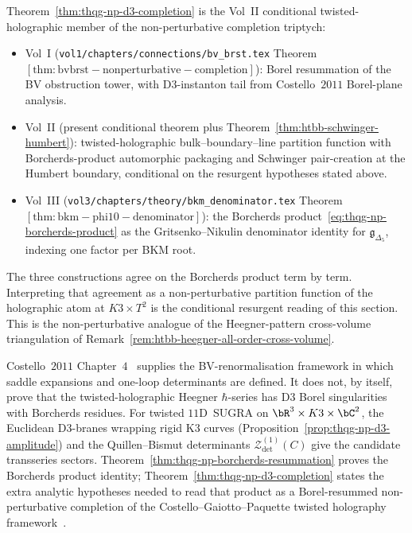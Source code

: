 \begin{remark}
\label{rem:thqg-np-cross-volume}
Theorem~\ref{thm:thqg-np-d3-completion} is the Vol~II conditional
twisted-holographic member of the non-perturbative completion
triptych:
\begin{itemize}[leftmargin=1.8em]
\item Vol~I (\texttt{vol1/chapters/connections/bv\_brst.tex}
Theorem~$\mathrm{[thm:bvbrst-nonperturbative-completion]}$): Borel
resummation of the BV obstruction tower, with D$3$-instanton tail
from Costello~$2011$ Borel-plane analysis.
\item Vol~II (present conditional theorem plus
Theorem~\ref{thm:htbb-schwinger-humbert}): twisted-holographic
bulk--boundary--line partition function with Borcherds-product
automorphic packaging and Schwinger pair-creation at the Humbert
boundary, conditional on the resurgent hypotheses stated above.
\item Vol~III
(\texttt{vol3/chapters/theory/bkm\_denominator.tex}
Theorem~$\mathrm{[thm:bkm-phi10-denominator]}$): the Borcherds
product~\eqref{eq:thqg-np-borcherds-product} as the
Gritsenko--Nikulin denominator identity for $\mathfrak{g}_{\Delta_5}$,
indexing one factor per BKM root.
\end{itemize}
The three constructions agree on the Borcherds product term by term.
Interpreting that agreement as a non-perturbative partition function
of the holographic atom at $K3\times T^2$ is the conditional
resurgent reading of this section. This is the
non-perturbative analogue of the Heegner-pattern cross-volume
triangulation of Remark~\ref{rem:htbb-heegner-all-order-cross-volume}.
\end{remark}

\begin{remark}
\label{rem:thqg-np-costello-renorm}
Costello~$2011$ Chapter~$4$~\cite[Ch.~4]{Costello2011} supplies the
BV-renormalisation framework in which saddle expansions and
one-loop determinants are defined. It does not, by itself, prove that
the twisted-holographic Heegner $\hbar$-series has D$3$ Borel
singularities with Borcherds residues. For twisted $11$D~SUGRA on
$\bR^3\times K3\times\bC^2$, the Euclidean D$3$-branes wrapping rigid
K$3$ curves (Proposition~\ref{prop:thqg-np-d3-amplitude}) and the
Quillen--Bismut determinants $\mathcal{Z}^{(1)}_{\det}(C)$ give the
candidate transseries sectors. Theorem~\ref{thm:thqg-np-borcherds-resummation}
proves the Borcherds product identity; Theorem~\ref{thm:thqg-np-d3-completion}
states the extra analytic hypotheses needed to read that product as a
Borel-resummed non-perturbative completion of the
Costello--Gaiotto--Paquette twisted holography
framework~\cite{CostelloGaiottoPaquette2018}.
\end{remark}

